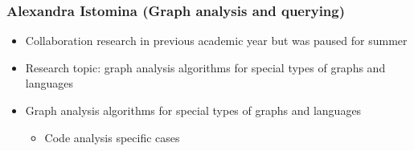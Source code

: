\documentclass[xcolor=table,aspectratio=169]{beamer}
\begin{document}
\begin{frame}[fragile]
  \frametitle{Alexandra Istomina (Graph analysis and querying)}
  \begin{minipage}[t]{0.48\textwidth}
    \begin{itemize}
      \item Collaboration research in previous academic year but was paused for summer
      \item Research topic: graph analysis algorithms for special types of graphs and languages
    \end{itemize}
  \end{minipage}
  \pause
  \begin{minipage}[t]{0.48\textwidth}
    \begin{itemize}
      \item[\faHourglassHalf] Graph analysis algorithms for special types of graphs and languages
      \begin{itemize}
        \item Code analysis specific cases
      \end{itemize}
    \end{itemize}
  \end{minipage}
\end{frame}
\end{document}

